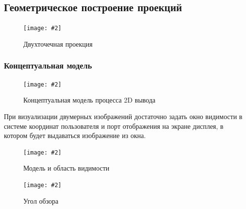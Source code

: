 \documentclass[a4paper, 14pt]{extarticle}
\newcommand{\screenshot}[3]{
	\begin{figure}[h]
		\centering
		\texttt{[image: \#2]}
		\caption{#3}
	\end{figure}
}
\begin{document}
\subsection{Геометрическое построение проекций}
\screenshot{width=9cm}{l5/S013.jpg}{Двухточечная проекция}

\subsubsection{Концептуальная модель}
\screenshot{width=\textwidth}{l5/S014.jpg}{Концептуальная модель процесса 2D вывода}

При визуализации двумерных изображений достаточно задать окно видимости в системе координат пользователя и порт отображения на экране дисплея, в котором будет выдаваться изображение из окна.

\screenshot{width=12cm}{l5/S015.jpg}{Модель и область видимости}

\screenshot{width=9cm}{l5/S018.jpg}{Угол обзора}
\end{document}
